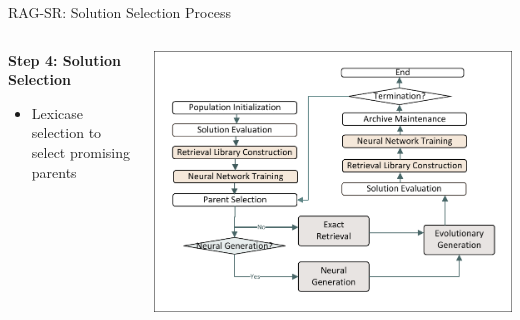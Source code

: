\documentclass[aspectratio=1610]{beamer}
\begin{document}
    \begin{frame}{RAG-SR: Solution Selection Process}
        \begin{columns}
            \begin{column}{0.5\textwidth}
                \textbf{Step 4: Solution Selection}
                \begin{itemize}
                    \item Lexicase selection to select promising parents
                \end{itemize}
            \end{column}
            \begin{column}{0.5\textwidth}
                \includegraphics[width=1.0\textwidth]{figs/Workflow.pdf}
            \end{column}
        \end{columns}
    \end{frame}
\end{document}
